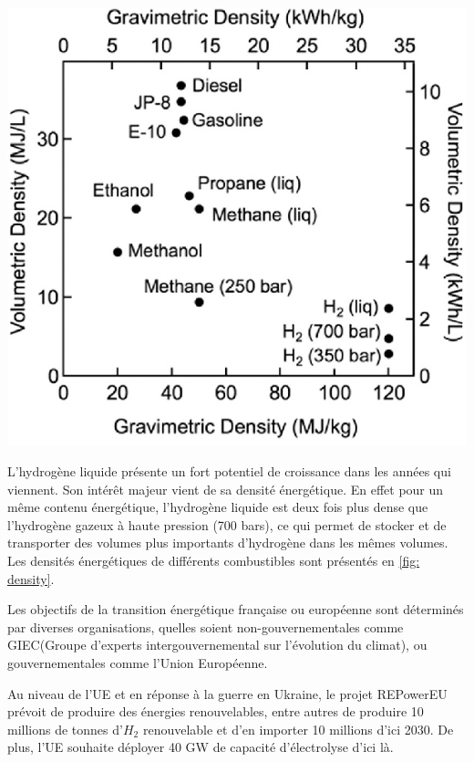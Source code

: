 \documentclass[11pt,french,a4paper]{article}
\begin{document}
\begin{multicols}{2}

\begin{center}
\includegraphics[width=.8\linewidth]{image/chap1/e-Comparison-of-gravimetric-density-and-volumetric-density-of-several-fuels-depending-on.PNG}
\label{fig: density}
\end{center}

L’hydrogène liquide présente un fort potentiel de croissance dans les années qui viennent. Son intérêt majeur vient de sa densité énergétique. En effet pour un même contenu énergétique, l’hydrogène liquide est deux fois plus dense que l’hydrogène gazeux à haute pression (700 bars), ce qui permet de stocker et de transporter des volumes plus importants d’hydrogène dans les mêmes volumes. Les densités énergétiques de différents combustibles sont présentés en \ref{fig: density}.

\end{multicols}

Les objectifs de la transition énergétique française ou européenne sont déterminés par diverses organisations, quelles soient non-gouvernementales comme GIEC(Groupe d'experts intergouvernemental sur l'évolution du climat), ou gouvernementales comme l'Union Européenne.

Au niveau de l’UE et en réponse à la guerre en Ukraine, le projet REPowerEU prévoit de produire des énergies renouvelables, entre autres de produire 10 millions de tonnes d’$H_2$ renouvelable et d’en importer 10 millions d’ici 2030. De plus, l’UE souhaite déployer 40 GW de capacité d’électrolyse d’ici là. \\
\end{document}
